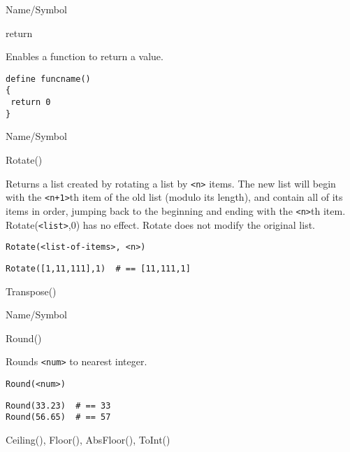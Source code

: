 \rl


\begin{desc}{Name/Symbol}
\item[Name/Symbol] 	return

\item[Description]  	Enables a function to return a value.

\item[Usage]
\begin{verbatim}
define funcname()
{
 return 0
}
\end{verbatim}

\item[Example]	

\item[See Also]	
\end{desc}

\rl


\begin{desc}{Name/Symbol}
\item[Name/Symbol]	Rotate()

\item[Description] 	Returns a list created by rotating a list by \verb!<n>! items.  
		The new list will begin with the \verb!<n+1>!th item of the old 
		list (modulo its length), and contain all of its items in 
		order, jumping back to the beginning and ending with the \verb!<n>!th
		item. Rotate(\verb!<list>!,0) has no effect.  Rotate does not modify 
		the original list.

\item[Usage]
\begin{verbatim}
Rotate(<list-of-items>, <n>)
\end{verbatim}

\item[Example]     	
\begin{verbatim}
Rotate([1,11,111],1)  # == [11,111,1]
\end{verbatim}

\item[See Also]    	Transpose()
\end{desc}

\rl


\begin{desc}{Name/Symbol}
\item[Name/Symbol] 	Round()

\item[Description] 	Rounds \verb+<num>+ to nearest integer.

\item[Usage]        	
\begin{verbatim}
Round(<num>)
\end{verbatim}

\item[Example]
\begin{verbatim}
Round(33.23)  # == 33
Round(56.65)  # == 57
\end{verbatim}

\item[See Also]     	Ceiling(), Floor(), AbsFloor(), ToInt()
\end{desc}

